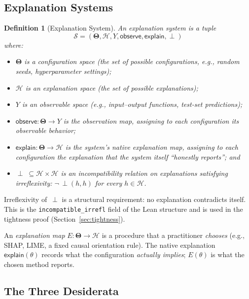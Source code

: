 \documentclass[11pt,a4paper]{article}
\newtheorem{definition}[theorem]{Definition}
\newcommand{\Params}{\mathbf{\Theta}}
\newcommand{\sH}{\mathcal{H}}
\newcommand{\incomp}{\perp}
\begin{document}
\subsection{Explanation Systems}

\begin{definition}[Explanation System]
\label{def:explanation-system}
An \emph{explanation system} is a tuple
\[
  \mathcal{S} = (\Params, \sH, Y, \mathsf{observe}, \mathsf{explain}, \incomp)
\]
where:
\begin{itemize}
  \item $\Params$ is a \emph{configuration space} (the set of possible
    configurations, e.g., random seeds, hyperparameter settings);
  \item $\sH$ is an \emph{explanation space} (the set of possible explanations);
  \item $Y$ is an \emph{observable space} (e.g., input--output functions,
    test-set predictions);
  \item $\mathsf{observe}: \Params \to Y$ is the \emph{observation map}, assigning
    to each configuration its observable behavior;
  \item $\mathsf{explain}: \Params \to \sH$ is the system's \emph{native
    explanation map}, assigning to each configuration the explanation that the
    system itself ``honestly reports''; and
  \item $\incomp\;\subseteq \sH \times \sH$ is an \emph{incompatibility relation}
    on explanations satisfying \emph{irreflexivity}:
    $\neg\,\incomp(h, h)$ for every $h \in \sH$.
\end{itemize}
\end{definition}

Irreflexivity of~$\incomp$ is a structural requirement: no explanation
contradicts itself.  This is the \texttt{incompatible\_irrefl} field of the
Lean structure and is used in the tightness proof
(Section~\ref{sec:tightness}).

An \emph{explanation map} $E : \Params \to \sH$ is a procedure that a
practitioner \emph{chooses} (e.g., SHAP, LIME, a fixed causal orientation
rule).  The native explanation $\mathsf{explain}(\theta)$ records what the
configuration \emph{actually implies}; $E(\theta)$ is what the chosen method
reports.

\subsection{The Three Desiderata}
\end{document}
